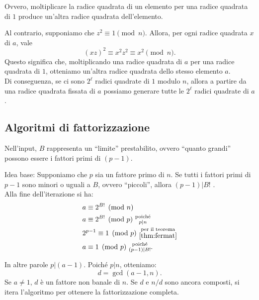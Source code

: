 
\noindent Ovvero, moltiplicare la radice quadrata di un elemento per una radice quadrata di $1$ produce un'altra radice quadrata dell'elemento. 

\vspace{0.2cm} \noindent Al contrario, supponiamo che $z^2 \equiv 1 \pmod n$. Allora, per ogni radice quadrata $x$ di $a$, vale
\[
(x z)^2 \equiv x^2 z^2 \equiv x^2 \pmod n.
\]
Questo significa che, moltiplicando una radice quadrata di $a$ per una radice quadrata di $1$, otteniamo un’altra radice quadrata dello stesso elemento $a$. \\ Di conseguenza, se ci sono $2^\ell$ radici quadrate di $1$ modulo $n$, allora a partire da una radice quadrata fissata di $a$ possiamo generare tutte le $2^\ell$ radici quadrate di $a$.

\subsection{Algoritmi di fattorizzazione}
 

\noindent Nell'input, $B$ rappresenta un ``limite'' prestabilito, ovvero ``quanto grandi'' possono essere i fattori primi di $(p-1)$.

\vspace{0.2cm} \noindent Idea base: Supponiamo che $p$ sia un fattore primo di $n$.
Se tutti i fattori primi di $p-1$ sono minori o uguali a $B$, ovvero ``piccoli'', allora $(p-1) | B!$ . \\ Alla fine dell'iterazione si ha: 
\[
\begin{aligned}
    &a \equiv 2^{B!} \pmod n\\
    &a \equiv 2^{B!} \pmod p \ \substack{\text{poiché} \\ p|n} \\
    &2^{p-1} \equiv 1 \pmod p \ \substack{\text{per il teorema} \\ \ref{thm:fermat}}\\
    & a \equiv 1 \pmod p \ \substack{\text{poiché} \\ (p-1) | B!}.\\
\end{aligned}
\]

\noindent In altre parole $p | (a-1)$. Poiché $p|n$, otteniamo:
\[
d= \gcd(a-1,n).
\]
Se $a \neq 1$, $d$ è un fattore non banale di $n$. Se $d$ e $n/d$ sono ancora composti, si itera l'algoritmo per ottenere la fattorizzazione completa. 
 
